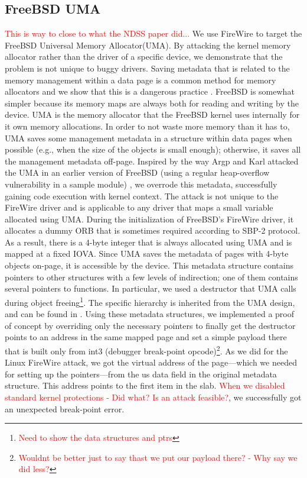 \subsection{FreeBSD UMA}
\textcolor{red}{This is way to close to what the NDSS paper did...}
We use FireWire to target the FreeBSD Universal Memory Allocator(UMA). By attacking the kernel memory allocator rather than the driver of a specific device, we demonstrate that the problem is not unique to buggy drivers. Saving metadata that is related to the memory management within a data page is a common method for memory allocators and we show that this is a dangerous practice \cite{Cor07, ak09}. FreeBSD is somewhat simpler because its memory maps are always both for reading and writing by the device. UMA is the memory allocator that the FreeBSD kernel uses internally for it own memory allocations. In order to not waste more memory than it has to, UMA saves some management metadata in a structure within data pages when possible (e.g., when the size of the objects is small enough); otherwise, it saves all the management metadata off-page. Inspired by the way Argp and Karl attacked the UMA in an earlier version of FreeBSD (using a regular heap-overflow vulnerability in a sample module) \cite{ak09}, we overrode this metadata, successfully gaining code execution with kernel context. The attack is not unique to the FireWire driver and is applicable to any driver that maps a small variable allocated using UMA. During the initialization of FreeBSD’s FireWire driver, it allocates a dummy ORB that is sometimes required according to SBP-2 protocol. As a result, there is a 4-byte integer that is always allocated using UMA and is mapped at a fixed IOVA. Since UMA saves the metadata of pages with 4-byte objects on-page, it is accessible by the device. This metadata structure contains pointers to other structures with a few levels of indirection; one of them contains several pointers to functions. In particular, we used a destructor that UMA calls during object freeing\footnote{\textcolor{red}{Need to show the data structures and ptrs}}. The specific hierarchy is inherited from the UMA design, and can be found in \cite{aA10}. Using these metadata structures, we implemented a proof of concept by overriding only the necessary pointers to finally get the destructor points to an address in the same mapped page and set a simple payload there that is built only from int3 (debugger break-point opcode)\footnote{\textcolor{red}{Wouldnt be better just to say thast we put our payload there? - Why say we did less?}}. As we did for the Linux FireWire attack, we got the virtual address of the page—which we needed for setting up the pointers—from the us data field in the original metadata structure. This address points to the first item in the slab. \textcolor{red}{When we disabled standard kernel protections - Did what? Is an attack feasible?}, we successfully got an unexpected break-point error.